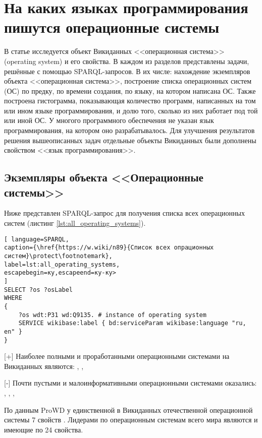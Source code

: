 \chapter{На каких языках программирования пишутся операционные системы}
\label{ch:operating-sysmets}

В статье исследуется объект Викиданных <<операционная система>> (operating system) и его свойства. В каждом из разделов представлены задачи, решённые с помощью SPARQL-запросов. В их числе: нахождение экземпляров объекта <<операционная система>>, построение списка операционных систем (ОС) по предку, по времени создания, по языку, на котором написана ОС. Также построена гистограмма, показывающая количество программ, написанных на том или ином языке программирования, и долю того, сколько из них работает под той или иной ОС. У многого программного обеспечения не указан язык программирования, на котором оно разрабатывалось. Для улучшения результатов решения вышеописанных задач отдельные объекты Викиданных были дополнены свойством <<язык программирования>>.


\section{Экземпляры объекта <<Операционные системы>>}
Ниже представлен SPARQL-запрос для получения списка всех операционных систем (листинг \ref{lst:all_operating_systems}).

\begin{lstlisting}[ language=SPARQL, 
caption={\href{https://w.wiki/n89}{Список всех опрационных систем}\protect\footnotemark},
label=lst:all_operating_systems, 
escapebegin=ку,escapeend=ку-ку>
]
SELECT ?os ?osLabel
WHERE
{
	?os wdt:P31 wd:Q9135. # instance of operating system
	SERVICE wikibase:label { bd:serviceParam wikibase:language "ru, en" }
}
\end{lstlisting}

[+] Наиболее полными и проработанными операционными системами на Викиданных являются: , , 

[-] Почти пустыми и малоинформативными операционными системами оказались: , , , 

По данным ProWD у единственной в Викиданных отечественной операционной системы  7 свойств \cite{prowd_os_link}. Лидерами по операционным системам всего мира являются  и  имеющие по 24 свойства.


